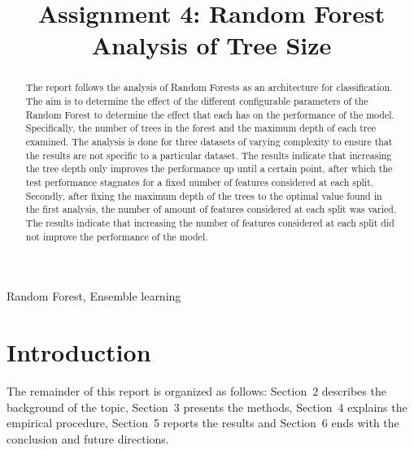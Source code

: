 \documentclass[conference]{IEEEtran}
\begin{document}
\title{Assignment 4: Random Forest Analysis of Tree Size}

\author{
}

\maketitle

\begin{abstract}
The report follows the analysis of Random Forests as an architecture for classification. The aim is to determine 
the effect of the different configurable parameters of the Random Forest to determine the effect that each has on 
the performance of the model. Specifically, the number of trees in the forest and the maximum depth of each tree
examined. The analysis is done for three datasets of varying complexity to ensure that the results are not 
specific to a particular dataset. The results indicate that increasing the tree depth only improves the performance 
up until a certain point, after which the test performance stagnates for a fixed number of features considered at each split.
Secondly, after fixing the maximum depth of the trees to the optimal value found in the first analysis, the number of 
amount of features considered at each split was varied. The results indicate that increasing the 
number of features considered at each split did not improve the performance of the model.  
\end{abstract}

\begin{IEEEkeywords}
Random Forest, Ensemble learning
\end{IEEEkeywords}

\section{Introduction}

The remainder of this report is organized as follows: Section~2 describes the background of the topic, 
Section~3 presents the methods, Section~4 explains the empirical procedure, Section~5 reports the results and Section~6 ends with the conclusion and future directions.
\end{document}
